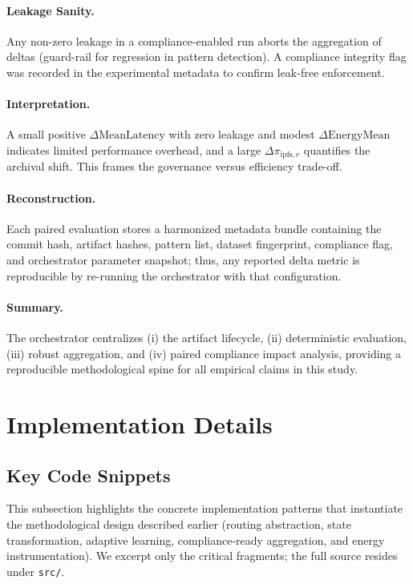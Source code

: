 \paragraph{Leakage Sanity.} Any non-zero leakage in a compliance-enabled run aborts the aggregation of deltas (guard-rail for regression in pattern detection). A compliance integrity flag was recorded in the experimental metadata to confirm leak-free enforcement.

\paragraph{Interpretation.} A small positive $\Delta \text{MeanLatency}$ with zero leakage and modest $\Delta \text{EnergyMean}$ indicates limited performance overhead, and a large $\Delta \pi_{\text{ipfs},r}$ quantifies the archival shift. This frames the governance versus efficiency trade-off.

\paragraph{Reconstruction.} Each paired evaluation stores a harmonized metadata bundle containing the commit hash, artifact hashes, pattern list, dataset fingerprint, compliance flag, and orchestrator parameter snapshot; thus, any reported delta metric is reproducible by re-running the orchestrator with that configuration.

\paragraph{Summary.} The orchestrator centralizes (i) the artifact lifecycle, (ii) deterministic evaluation, (iii) robust aggregation, and (iv) paired compliance impact analysis, providing a reproducible methodological spine for all empirical claims in this study.

\section{Implementation Details}\label{s:implementation-details}

\subsection{Key Code Snippets}
This subsection highlights the concrete implementation patterns that instantiate the methodological design described earlier (routing abstraction, state transformation, adaptive learning, compliance-ready aggregation, and energy instrumentation). We excerpt only the critical fragments; the full source resides under \texttt{src/}.

